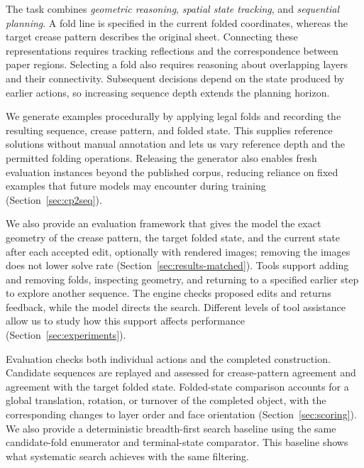 The task combines \emph{geometric reasoning}, \emph{spatial state tracking}, and
\emph{sequential planning}. A fold line is specified in the current folded coordinates, whereas
the target crease pattern describes the original sheet. Connecting these representations requires
tracking reflections and the correspondence between paper regions. Selecting a fold also requires
reasoning about overlapping layers and their connectivity. Subsequent decisions depend on the
state produced by earlier actions, so increasing sequence depth extends the planning horizon.

We generate examples procedurally by applying legal folds and recording the resulting sequence,
crease pattern, and folded state. This supplies reference solutions without manual annotation and
lets us vary reference depth and the permitted folding operations. Releasing
the generator also enables fresh evaluation instances beyond the published corpus, reducing
reliance on fixed examples that future models may encounter during training
(Section~\ref{sec:cp2seq}).

We also provide an evaluation framework that gives the model the exact geometry of the crease
pattern, the target folded state, and the current state after each accepted edit, optionally with
rendered images; removing the images does not lower solve rate (Section~\ref{sec:results-matched}). Tools support adding and
removing folds, inspecting geometry, and returning to a specified earlier step to explore another
sequence. The engine checks proposed edits and returns feedback, while the model directs the
search. Different levels of tool assistance allow us to study how this support affects performance
(Section~\ref{sec:experiments}).

Evaluation checks both individual actions and the completed construction. Candidate sequences
are replayed and assessed for crease-pattern agreement and agreement with the target folded
state. Folded-state comparison
accounts for a global translation, rotation, or turnover of the completed object, with the
corresponding changes to layer order and face orientation (Section~\ref{sec:scoring}).
We also provide a deterministic breadth-first search
baseline using the same candidate-fold enumerator and terminal-state comparator. This baseline
shows what systematic search achieves with the same filtering.

